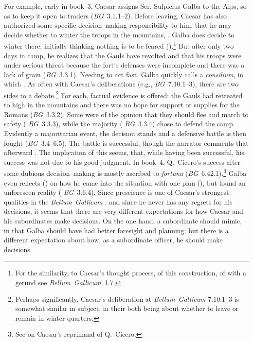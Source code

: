 \documentclass[12pt,letterpaper,oneside,final]{memoir}
\begin{document}
For example, early in book~3, Caesar assigns Ser. Sulpicius Galba to the Alps, so as to keep it open to traders (\emph{BG}~3.1.1--2). Before leaving, Caesar has also authorized some specific decision--making responsibility to him, that he may decide whether to winter the troops in the mountains, . Galba does decide to winter there, initially thinking nothing is to be feared ().\footnote{ For the similarity, to Caesar's thought process, of this construction, of  with a gerund see \emph{Bellum~Gallicum}~1.7.} But after only two days in camp, he realizes that the Gauls have revolted and that his troops were under serious threat because the fort's defenses were incomplete and there was a lack of grain (\emph{BG}~3.3.1). Needing to act fast, Galba quickly calls a \emph{consilium}, in which . As often with Caesar's deliberations (e.g., \emph{BG}~7.10.1--3), there are two sides to a debate.\footnote{Perhaps significantly, Caesar's deliberation at \emph{Bellum~Gallicum} 7.10.1--3 is somewhat similar in subject, in their both being about whether to leave or remain in winter quarters.} For each, factual evidence is offered: the Gauls had retreated to high in the mountains and there was no hope for support or supplies for the Romans (\emph{BG}~3.3.2). Some were of the opinion that they should flee and march to safety ( \emph{BG}~3.3.3), while the majority ( \emph{BG}~3.3.4) chose to defend the camp. Evidently a majoritarian event, the decision stands and a defensive battle is then fought (\emph{BG}~3.4--6.5). The battle is successful, though the narrator comments that afterward . The implication of this seems, that, while having been successful, his success was not due to his good judgment. In book~4, Q.~Cicero's success after some dubious decision--making is mostly ascribed to \emph{fortuna} (\emph{BG}~6.42.1).\footnote{See \textcite[95--96]{riggsby2006} on Caesar's reprimand of Q.~Cicero.} Galba even reflects () on how he came into the situation with one plan (), but found an unforeseen reality ( \emph{BG}~3.6.4). Since prescience is one of Caesar's strongest qualities in the \emph{Bellum~Gallicum} \parencite[pp.~193 and 248 n.~5]{riggsby2006}, and since he never has any regrets for his decisions, it seems that there are very different expectations for how Caesar and his subordinates make decisions. On the one hand, a subordinate should mimic, in that Galba should have had better foresight and planning; but there is a different expectation about how, as a subordinate officer, he should make decisions.
\end{document}
